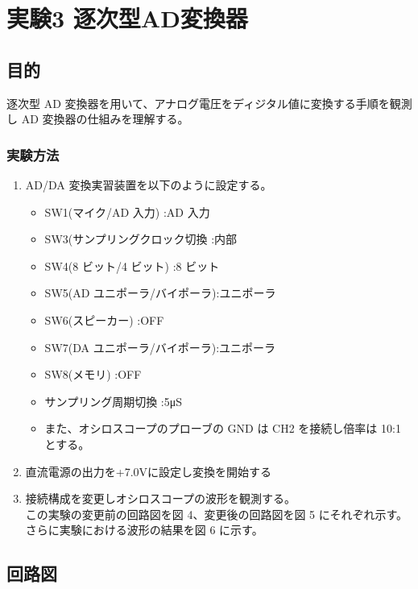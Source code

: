 \documentclass[10pt]{article}
\begin{document}
\section{実験3 逐次型AD変換器}
\subsection{目的}
逐次型 AD 変換器を用いて、アナログ電圧をディジタル値に変換する手順を観測し AD 変換器の仕組みを理解する。

\subsubsection{実験方法}
\begin{enumerate}
    \item AD/DA 変換実習装置を以下のように設定する。
        \begin{itemize}
            \item SW1(マイク/AD 入力) :AD 入力 
            \item SW3(サンプリングクロック切換 :内部 
            \item SW4(8 ビット/4 ビット) :8 ビット 
            \item SW5(AD ユニポーラ/バイポーラ):ユニポーラ 
            \item SW6(スピーカー) :OFF 
            \item SW7(DA ユニポーラ/バイポーラ):ユニポーラ 
            \item SW8(メモリ) :OFF
            \item サンプリング周期切換 :5μS
            \item また、オシロスコープのプローブの GND は CH2 を接続し倍率は 10:1 とする。
        \end{itemize}
    \item 直流電源の出力を+7.0Vに設定し変換を開始する
    \item 接続構成を変更しオシロスコープの波形を観測する。\\ この実験の変更前の回路図を図 4、変更後の回路図を図 5 にそれぞれ示す。\\ さらに実験における波形の結果を図 6 に示す。
\end{enumerate}


 
\subsection{回路図}
\end{document}
